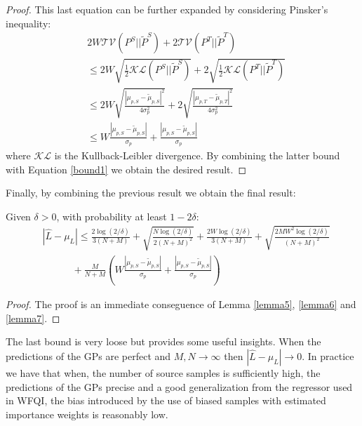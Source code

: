 \begin{proof}
        \noindent This last equation can be further expanded by considering Pinsker's inequality:
        \begin{equation}
          \begin{aligned}
            & 2W\mathcal{TV}(P^{S}||\tilde{P}^{S}) + 2\mathcal{TV}(P^{T}||\tilde{P}^{T}) \\
            & \leq 2W \sqrt{\frac{1}{2} \mathcal{KL}(P^{S}||\tilde{P}^{S})} + 2\sqrt{\frac{1}{2}\mathcal{KL}(P^{T}||\tilde{P}^{T})} \\
            & \leq 2W \sqrt{\frac{|\mu_{p,S} - \tilde{\mu}_{p,S}|^{2}}{4\sigma^{2}_{p}}} + 2\sqrt{\frac{|\mu_{p,T} - \tilde{\mu}_{p,T}|^{2}}{4\sigma^{2}_{p}}} \\
            & \leq W \frac{|\mu_{p,S} - \tilde{\mu}_{p,S}|}{\sigma_{p}} + \frac{|\mu_{p,S} - \tilde{\mu}_{p,S}|}{\sigma_{p}}
          \end{aligned}
        \end{equation}
        where $\mathcal{KL}$ is the Kullback-Leibler divergence. By combining the latter bound with Equation \ref{bound1} we obtain the
        desired result.
      \end{proof}

      \noindent Finally, by combining the previous result we obtain the final result:
      \begin{theorem}
        Given $\delta > 0$, with probability at least $1-2\delta$:
        \begin{equation}
          \begin{aligned}
            & \left | \hat{L}-\mu_{L} \right | \leq \frac{2\log(2/\delta)}{3(N+M)} + \sqrt{\frac{N\log(2/\delta)}{2(N+M)^{2}}} + \frac{2W\log(2/\delta)}{3(N+M)}+ \sqrt{\frac{2MW^{2}\log(2/\delta)}{(N+M)^{2}}} \\
            & \qquad \quad + \frac{M}{N+M} \left ( W \frac{|\mu_{p,S} - \tilde{\mu}_{p,S}|}{\sigma_{p}} + \frac{|\mu_{p,S} - \tilde{\mu}_{p,S}|}{\sigma_{p}} \right )
          \end{aligned}
        \end{equation}
      \end{theorem}
      \begin{proof}
        The proof is an immediate conseguence of Lemma \ref{lemma5}, \ref{lemma6} and \ref{lemma7}.
      \end{proof}
      \vspace{2cm}

      \noindent The last bound is very loose but provides some useful insights. When the predictions of the GPs are
      perfect and $M, N \rightarrow \infty$ then $|\hat{L}-\mu_{L}| \rightarrow 0$. In practice we have that when,
      the number of source samples is sufficiently high, the predictions of the GPs precise and a good generalization
      from the regressor used in WFQI, the bias introduced by the use of biased samples with estimated importance
      weights is reasonably low.\newline

